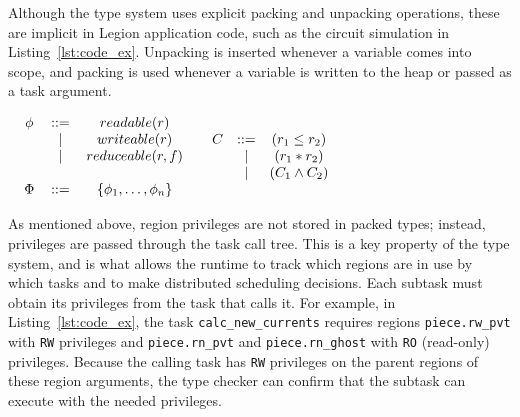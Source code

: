 Although the type system uses explicit packing and unpacking operations, 
these are implicit in Legion application code, such as the
circuit simulation in Listing~\ref{lst:code_ex}.  Unpacking is
inserted whenever a variable comes into scope, and packing is used
whenever a variable is written to the heap or passed as a task argument.


\begin{table}
\centering
{\small
\begin{math}
\begin{array}{cc}
\begin{tabular}{ccc}
$\phi$ & ::= & $readable(r)$ \\
  &$\mid$&$writeable(r)$ \\
  &$\mid$&$reduceable(r,f)$ \\
\\
$\Phi$ & ::= & $\{ \phi_1, \ldots, \phi_n \}$
\end{tabular}
&
\begin{array}{ccc}
C & ::= & (r_1 \rleq r_2) \\
  &\mid&(r_1 * r_2) \\
  &\mid&(C_1 \wedge C_2) \\
\end{array}
\end{array}
\end{math}
}
\label{tbl:priv_const}
\caption{Privileges and Constraints}
\end{table}

As mentioned above, region privileges are not stored in packed types;
instead, privileges are passed through the task call tree.  This is a key
property of the type system, and is what allows the runtime to 
track which regions are in use by which tasks and to make distributed
scheduling decisions.
Each subtask must obtain its privileges from
the task that calls it.  For example, in Listing~\ref{lst:code_ex},
the task {\tt calc\_new\_currents} requires regions {\tt piece.rw\_pvt} with {\tt RW} privileges
and {\tt piece.rn\_pvt} and {\tt piece.rn\_ghost} with {\tt RO} (read-only) privileges.  Because the calling task has {\tt RW} privileges on the parent regions of these
region arguments, the type checker can confirm that the subtask can execute with the needed privileges.


